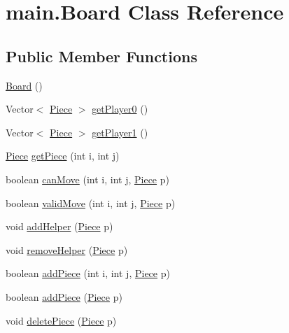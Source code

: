 \hypertarget{classmain_1_1_board}{}\section{main.\+Board Class Reference}
\label{classmain_1_1_board}
\subsection*{Public Member Functions}
\begin{DoxyCompactItemize}
\item 
\mbox{\hyperlink{classmain_1_1_board_ac64a3f3f09655e7a7c8d357571a0cdf9}{Board}} ()
\item 
Vector$<$ \mbox{\hyperlink{classmain_1_1_piece}{Piece}} $>$ \mbox{\hyperlink{classmain_1_1_board_ab8f45e143d9ab246851f7f97c5bfa364}{get\+Player0}} ()
\item 
Vector$<$ \mbox{\hyperlink{classmain_1_1_piece}{Piece}} $>$ \mbox{\hyperlink{classmain_1_1_board_aa54c43be78a8a97135eba9eb6a4b7167}{get\+Player1}} ()
\item 
\mbox{\hyperlink{classmain_1_1_piece}{Piece}} \mbox{\hyperlink{classmain_1_1_board_a8b2db43ffcdbf9f41afc16c78c3475e8}{get\+Piece}} (int i, int j)
\item 
boolean \mbox{\hyperlink{classmain_1_1_board_a4b106e6cb7a063ccc588cd1b54541ca2}{can\+Move}} (int i, int j, \mbox{\hyperlink{classmain_1_1_piece}{Piece}} p)
\item 
boolean \mbox{\hyperlink{classmain_1_1_board_ab7743e041d844346979698189dfa4299}{valid\+Move}} (int i, int j, \mbox{\hyperlink{classmain_1_1_piece}{Piece}} p)
\item 
void \mbox{\hyperlink{classmain_1_1_board_a285ab1b37126a791616a59026d405e72}{add\+Helper}} (\mbox{\hyperlink{classmain_1_1_piece}{Piece}} p)
\item 
void \mbox{\hyperlink{classmain_1_1_board_a714d8c161ee96e2562a20abe0e394378}{remove\+Helper}} (\mbox{\hyperlink{classmain_1_1_piece}{Piece}} p)
\item 
boolean \mbox{\hyperlink{classmain_1_1_board_a7f40dfa8de3b0b03284560929aa3cd55}{add\+Piece}} (int i, int j, \mbox{\hyperlink{classmain_1_1_piece}{Piece}} p)
\item 
boolean \mbox{\hyperlink{classmain_1_1_board_a7315f5cc093b0d5d3b13d3977e15e12e}{add\+Piece}} (\mbox{\hyperlink{classmain_1_1_piece}{Piece}} p)
\item 
void \mbox{\hyperlink{classmain_1_1_board_a53ca69a503ff1065a3712d905c1e2625}{delete\+Piece}} (\mbox{\hyperlink{classmain_1_1_piece}{Piece}} p)

\end{DoxyCompactItemize}
